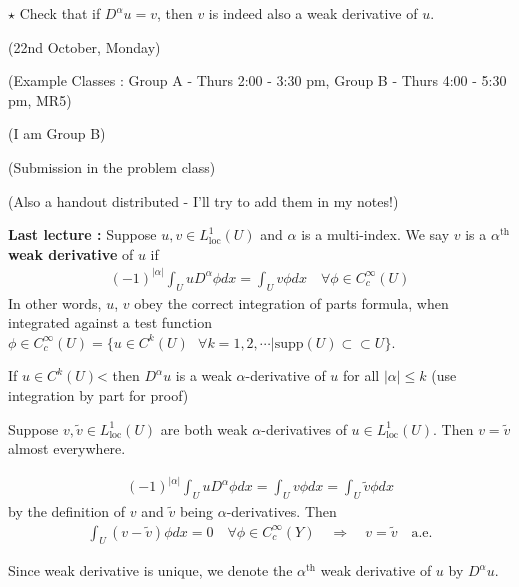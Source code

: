 \documentclass[10pt,a4paper]{report}
\newenvironment{proof}
{\begin{changemargin}{1cm}{0.5cm} 
	}%
	{\end{changemargin}
}
\begin{document}
$\star$ Check that if $D^{\alpha} u = v$, then $v$ is indeed also a weak derivative of $u$.
\s

\newday

(22nd October, Monday)
\s

(Example Classes : Group A - Thurs 2:00 - 3:30 pm, Group B - Thurs 4:00 - 5:30 pm, MR5)

(I am Group B)

(Submission in the problem class)

(Also a handout distributed - I'll try to add them in my notes!)
\s

\textbf{Last lecture :} Suppose $u,v\in L^1_{\text{loc}}(U)$ and $\alpha$ is a multi-index. We say $v$ is a \textbf{$\alpha^{\text{th}}$ weak derivative} of $u$ if
\begin{align*}
(-1)^{|\alpha|} \int_{U} uD^{\alpha} \phi dx = \int_U v\phi dx \quad \forall \phi \in C^{\infty}_c(U)
\end{align*}
In other words, $u$, $v$ obey the correct integration of parts formula, when integrated against a test function $\phi \in C^{\infty}_c(U) = \{u\in C^k(U) \,\,\,\, \forall k=1,2,\cdots | \text{supp}(U) \subset \subset U \}$.
\s

If $u\in C^k(U)$< then $D^{\alpha} u$ is a weak $\alpha$-derivative of $u$ for all $|\alpha| \leq k$ (use integration by part for proof)
\s

\newcommand{\loc}{L^1_{\text{loc}}}

\lem Suppose $v,\tilde{v} \in \loc (U)$ are both weak $\alpha$-derivatives of $u\in \loc (U)$. Then $v= \tilde{v}$ almost everywhere.
\begin{proof}
\pf \begin{align*}
(-1)^{|\alpha|} \int_U uD^{\alpha} \phi dx = \int_U v \phi dx = \int_U \tilde{v} \phi dx
\end{align*}
by the definition of $v$ and $\tilde{v}$ being $\alpha$-derivatives. Then
\begin{align*}
\int_U (v-\tilde{v}) \phi dx =0 \quad \forall \phi \in C^{\infty}_c (Y) \quad \Rightarrow \quad v= \tilde{v} \quad \text{a.e.}
\end{align*}

\eop
\end{proof}
\s

Since weak derivative is unique, we denote the $\alpha^{\text{th}}$ weak derivative of $u$ by $D^{\alpha} u$.
\end{document}
